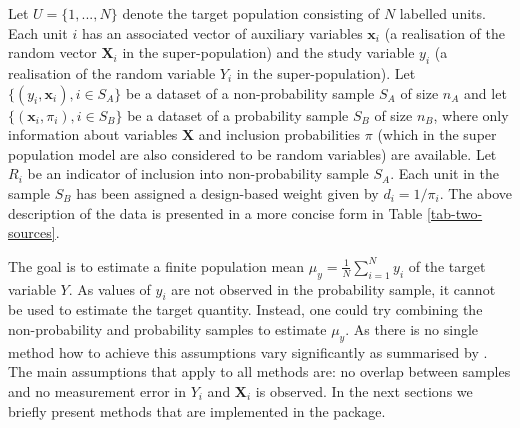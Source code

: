 \documentclass[
]{jss}
\begin{document}
Let \(U=\{1,..., N\}\) denote the target population consisting of \(N\)
labelled units. Each unit \(i\) has an associated vector of auxiliary
variables \(\boldsymbol{x}_{i}\) (a realisation of the random vector
\(\boldsymbol{X}_{i}\) in the super-population) and the study variable
\(y_{i}\) (a realisation of the random variable \(Y_{i}\) in the
super-population). Let \(\{ (y_i, \boldsymbol{x}_i), i \in S_A\}\) be a
dataset of a non-probability sample \(S_A\) of size \(n_A\) and let
\(\{\left(\boldsymbol{x}_i, \pi_{i}\right), i \in S_B\}\) be a dataset
of a probability sample \(S_B\) of size \(n_B\), where only information
about variables \(\boldsymbol{X}\) and inclusion probabilities \(\pi\)
(which in the super population model are also considered to be random
variables) are available. Let \(R_i\) be an indicator of inclusion into
non-probability sample \(S_A\). Each unit in the sample \(S_B\) has been
assigned a design-based weight given by \(d_i = 1/\pi_i\). The above
description of the data is presented in a more concise form in Table
\ref{tab-two-sources}.

\begin{table}[ht!]
    \centering
    \caption{Two sample setting.}
    \label{tab-two-sources}
\end{table}

The goal is to estimate a finite population mean
\(\displaystyle\mu_{y}=\frac{1}{N}\sum_{i=1}^{N} y_{i}\) of the target
variable \(Y\). As values of \(y_{i}\) are not observed in the
probability sample, it cannot be used to estimate the target quantity.
Instead, one could try combining the non-probability and probability
samples to estimate \(\mu_{y}\). As there is no single method how to
achieve this assumptions vary significantly as summarised by
\citet{wu2022statistical}. The main assumptions that apply to all
methods are: no overlap between samples and no measurement error in
\(Y_i\) and \(\boldsymbol{X}_i\) is observed. In the next sections we
briefly present methods that are implemented in the package.
\end{document}
